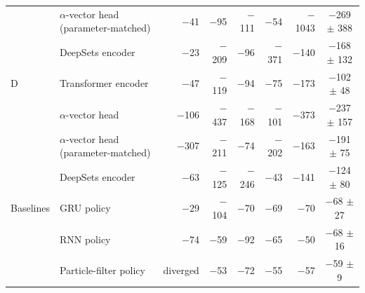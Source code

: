 \documentclass[11pt]{article}
\begin{document}
\begin{table}[htbp]
\begin{tabular}{llrrrrrc}
 & $\alpha$-vector head (parameter-matched) & $-$41 & $-$95 & $-$111 & $-$54 & $-$1043 & $-$269 $\pm$ 388 \\
 & DeepSets encoder & $-$23 & $-$209 & $-$96 & $-$371 & $-$140 & $-$168 $\pm$ 132 \\
\midrule
D & Transformer encoder & $-$47 & $-$119 & $-$94 & $-$75 & $-$173 & $-$102 $\pm$ 48 \\
 & $\alpha$-vector head & $-$106 & $-$437 & $-$168 & $-$101 & $-$373 & $-$237 $\pm$ 157 \\
 & $\alpha$-vector head (parameter-matched) & $-$307 & $-$211 & $-$74 & $-$202 & $-$163 & $-$191 $\pm$ 75 \\
 & DeepSets encoder & $-$63 & $-$125 & $-$246 & $-$43 & $-$141 & $-$124 $\pm$ 80 \\
\midrule
Baselines & GRU policy & $-$29 & $-$104 & $-$70 & $-$69 & $-$70 & $-$68 $\pm$ 27 \\
 & RNN policy & $-$74 & $-$59 & $-$92 & $-$65 & $-$50 & $-$68 $\pm$ 16 \\
 & Particle-filter policy & diverged & $-$53 & $-$72 & $-$55 & $-$57 & $-$59 $\pm$ 9 \\
\bottomrule
\end{tabular}
\end{table}
\end{document}

